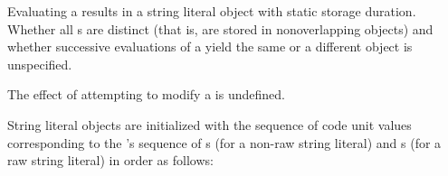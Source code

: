 \documentclass{wg21}
\begin{document}
\pnum
Evaluating a  results in a string literal object
with static storage duration.
%
Whether all s are distinct (that is, are stored in
nonoverlapping objects) and whether successive evaluations of a
 yield the same or a different object is
unspecified.
\begin{note}
    The effect of attempting to modify a  is undefined.
\end{note}

\pnum
String literal objects are initialized with
the sequence of code unit values
corresponding to the 's sequence of
s (for a non-raw string literal) and
s (for a raw string literal)
in order as follows:
\end{document}
